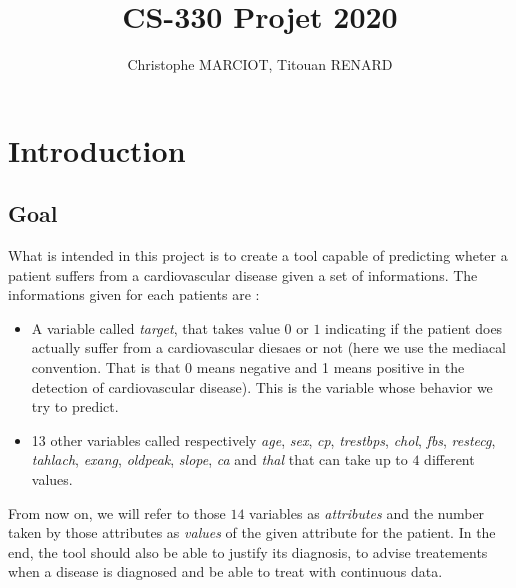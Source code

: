 \documentclass[french]{article}
\title{CS-330 Projet 2020}   %
\author{Christophe MARCIOT, Titouan RENARD}         %
\begin{document}
\maketitle

\section{Introduction}

\subsection{Goal}

What is intended in this project is to create a tool capable of predicting wheter a patient suffers from a cardiovascular disease given a set of informations.
The informations given for each patients are :
	\begin{itemize}
		\item A variable called \emph{target}, that takes value $0$ or $1$ indicating if the patient does actually suffer from a cardiovascular diesaes or not (here we use the mediacal convention. That is that 0 means negative and 1 means positive in the detection of cardiovascular disease). This is the variable whose behavior we try to predict.
		\item 13 other variables called respectively \emph{age}, \emph{sex}, \emph{cp}, \emph{trestbps}, \emph{chol}, \emph{fbs}, \emph{restecg}, \emph{tahlach}, \emph {exang}, \emph{oldpeak}, \emph{slope}, \emph{ca} and \emph{thal} that can take up to $4$ different values.
	\end{itemize}
From now on, we will refer to those $14$  variables as \emph{attributes} and the number taken by those attributes as \emph{values} of the given attribute for the patient. In the end, the tool should also be able to justify its diagnosis, to advise treatements when a disease is diagnosed and be able to treat with continuous data.
\end{document}
